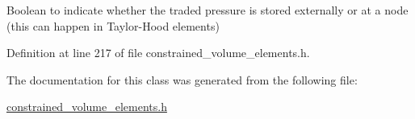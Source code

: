 Boolean to indicate whether the traded pressure is stored externally or at a node (this can happen in Taylor-\/\+Hood elements) 



Definition at line 217 of file constrained\+\_\+volume\+\_\+elements.\+h.



The documentation for this class was generated from the following file\+:\begin{DoxyCompactItemize}
\item 
\hyperlink{constrained__volume__elements_8h}{constrained\+\_\+volume\+\_\+elements.\+h}\end{DoxyCompactItemize}
